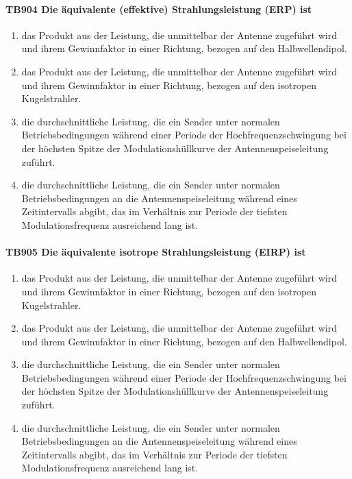 \documentclass[8pt]{article}
\begin{document}
\begin{enumerate}
\paragraph*{TB904 Die äquivalente (effektive) Strahlungsleistung (ERP) ist}
\begin{enumerate}[nolistsep,label=\Alph*]
\item das Produkt aus der Leistung, die unmittelbar der Antenne zugeführt wird und ihrem Gewinnfaktor in einer Richtung, bezogen auf den Halbwellendipol.
\item das Produkt aus der Leistung, die unmittelbar der Antenne zugeführt wird und ihrem Gewinnfaktor in einer Richtung, bezogen auf den isotropen Kugelstrahler.
\item die durchschnittliche Leistung, die ein Sender unter normalen Betriebsbedingungen während einer Periode der Hochfrequenzschwingung bei der höchsten Spitze der Modulationshüllkurve der Antennenspeiseleitung zuführt.
\item die durchschnittliche Leistung, die ein Sender unter normalen Betriebsbedingungen an die Antennenspeiseleitung während eines Zeitintervalls abgibt, das im Verhältnis zur Periode der tiefsten Modulationsfrequenz ausreichend lang ist.
\end{enumerate}

\paragraph*{TB905 Die äquivalente isotrope Strahlungsleistung (EIRP) ist}
\begin{enumerate}[nolistsep,label=\Alph*]
\item das Produkt aus der Leistung, die unmittelbar der Antenne zugeführt wird und ihrem Gewinnfaktor in einer Richtung, bezogen auf den isotropen Kugelstrahler.
\item das Produkt aus der Leistung, die unmittelbar der Antenne zugeführt wird und ihrem Gewinnfaktor in einer Richtung, bezogen auf den Halbwellendipol.
\item die durchschnittliche Leistung, die ein Sender unter normalen Betriebsbedingungen während einer Periode der Hochfrequenzschwingung bei der höchsten Spitze der Modulationshüllkurve der Antennenspeiseleitung zuführt.
\item die durchschnittliche Leistung, die ein Sender unter normalen Betriebsbedingungen an die Antennenspeiseleitung während eines Zeitintervalls abgibt, das im Verhältnis zur Periode der tiefsten Modulationsfrequenz ausreichend lang ist.
\end{enumerate}


\end{enumerate}
\end{document}
